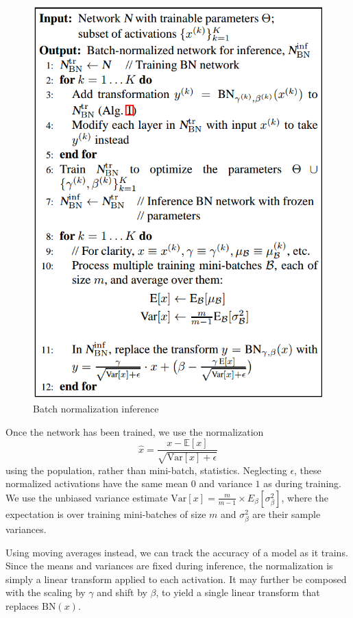 \documentclass[a3paper, 12pt]{book} %
\begin{document}
\begin{figure}[htpb]
	\centering
	\includegraphics[width=\linewidth]{figures/bn_inference.png}
	\caption{Batch normalization inference}
	\label{fig:boat1}
\end{figure}
Once the network has been trained, we use the
normalization
$$\hat{x}=\frac{x-\mathbb{E}{[x]}}{\sqrt{\mathrm{Var}{[x]}+\epsilon}}$$
using the population, rather than mini-batch, statistics. Neglecting $\epsilon$, these normalized activations have the same mean $0$ and variance $1$ as during training. We use the unbiased variance estimate $\mathrm{Var}{[x]} = \frac{m}{m-1} \times E_{\beta}{[\sigma_{\beta}^2]}$, where
the expectation is over training mini-batches of size $m$ and $\sigma_{\beta}^2$ are their sample variances. 

Using moving averages instead, we can track the accuracy of a model as it trains.
Since the means and variances are fixed during inference,
the normalization is simply a linear transform applied to
each activation. It may further be composed with the scaling by $\gamma$ and shift by $\beta$, to yield a single linear transform
that replaces $\mathrm{BN}(x)$.
\end{document}
